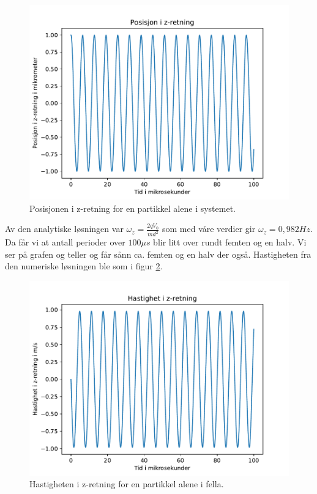 \documentclass[reprint,english,notitlepage]{revtex4-1}  %
\begin{document}
\begin{figure}[H]
	\label{r1z}
	\centering 
	\includegraphics[scale=0.4]{../pythonplots/r1z.pdf}
	\caption{Posisjonen i z-retning for en partikkel alene i systemet.}
\end{figure}
Av den analytiske løsningen var $\omega_z=\frac{2qV_0}{md^2}$ som med våre verdier gir $\omega_z=0,982Hz$. Da får vi at antall perioder over $100 \mu s$ blir litt over rundt femten og en halv. Vi ser på grafen og teller og får sånn ca. femten og en halv der også.
Hastigheten fra den numeriske løsningen ble som i figur \ref{v1z}.
\begin{figure}[H]
	\label{v1z}
	\centering 
	\includegraphics[scale=0.4]{../pythonplots/vz.pdf}
	\caption{Hastigheten i z-retning for en partikkel alene i fella.}
\end{figure}
\end{document}
